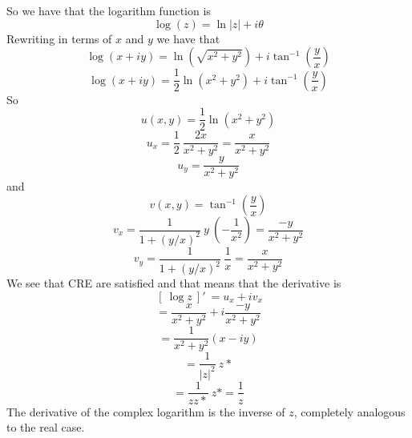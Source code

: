 \documentclass[11pt, oneside]{article}   	%
\begin{document}
So we have that the logarithm function is
\[ \log(z) = \ln |z| + i \theta \]
Rewriting in terms of $x$ and $y$ we have that
\[ \log (x+iy) = \ln (\sqrt{x^2 + y^2}) + i \tan^{-1} (\frac{y}{x}) \]
\[ \log (x+iy) = \frac{1}{2} \ln (x^2 + y^2) + i \tan^{-1} (\frac{y}{x}) \]
So
\[ u(x,y) = \frac{1}{2} \ln (x^2 + y^2) \]
\[ u_x = \frac{1}{2} \ \frac{2x}{x^2 + y^2} = \frac{x}{x^2 + y^2} \]
\[ u_y = \frac{y}{x^2 + y^2} \]
and 
\[ v(x,y) = \tan^{-1} (\frac{y}{x}) \]
\[ v_x = \frac{1}{1 + (y/x)^2} \ y \ (-\frac{1}{x^2}) = \frac{-y}{x^2 + y^2} \]
\[ v_y = \frac{1}{1 + (y/x)^2} \ \frac{1}{x} = \frac{x}{x^2 + y^2} \]
We see that CRE are satisfied and that means that the derivative is
\[ \ [ \ \log z \ ] ' \ = u_x + i v_x \]
\[ = \frac{x}{x^2 + y^2} + i \frac{-y}{x^2 + y^2} \] 
\[ = \frac{1}{x^2 + y^2} (x - i y) \]
\[ = \frac{1}{|z|^2} \ z* \]
\[ =  \frac{1}{zz*} \ z* = \frac{1}{z} \]
The derivative of the complex logarithm is the inverse of $z$, completely analogous to the real case.
\end{document}
